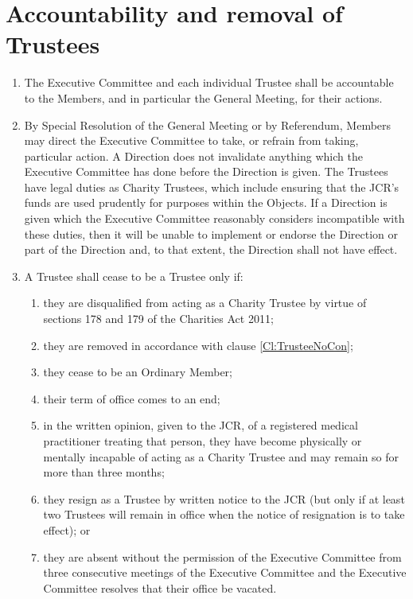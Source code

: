 \documentclass[11pt,a4paper, oneside]{memoir}
\begin{document}
	\section{Accountability and removal of Trustees}
	 \label{Art:TrusteeAccountability}
	 \begin{enumerate}
	 	\item The Executive Committee and each individual Trustee shall be accountable to the Members, and in particular the General Meeting, for their actions.
	 	\item By Special Resolution of the General Meeting or by Referendum, Members may direct the Executive Committee to take, or refrain from taking, particular action.
	 	A Direction does not invalidate anything which the Executive Committee has done before the Direction is given.
	 	The Trustees have legal duties as Charity Trustees, which include ensuring that the JCR's funds are used prudently for purposes within the Objects.
	 	If a Direction is given which the Executive Committee reasonably considers incompatible with these duties, then it will be unable to implement or endorse the Direction or part of the Direction and, to that extent, the Direction shall not have effect. 
	 	\item \label{Cl:TrusteeRemoval} A Trustee shall cease to be a Trustee only if:
	 	\begin{enumerate}
	 		\item they are disqualified from acting as a Charity Trustee by virtue of sections 178 and 179 of the Charities Act 2011;
	 		\item they are removed in accordance with clause \ref{Cl:TrusteeNoCon};
	 		\item they cease to be an Ordinary Member;
	 		\item their term of office comes to an end;
	 		\item in the written opinion, given to the JCR, of a registered medical practitioner treating that person, they have become physically or mentally incapable of acting as a Charity Trustee and may remain so for more than three months;
	 		\item they resign as a Trustee by written notice to the JCR (but only if at least two Trustees will remain in office when the notice of resignation is to take effect); or
	 		\item they are absent without the permission of the Executive Committee from three consecutive meetings of the Executive Committee and the Executive Committee resolves that their office be vacated.

\end{enumerate}
\end{enumerate}
\end{document}
